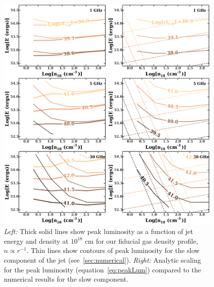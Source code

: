 \documentclass[usenatbib,fleqn]{mnras}
\begin{document}
\begin{figure}
  \includegraphics[width=16cm]{lp_contours_new.pdf}
  \caption{\label{fig:jetContours} {\it {Left:}} Thick solid lines
    show peak luminosity as a function of jet energy and density at
    $10^{18}$ cm for our fiducial gas density profile, $n\propto
    r^{-1}$. Thin lines show contours of peak luminosity for the slow
    component of the jet (see~\ref{sec:numerical}). {\it Right:} Analytic
    scaling for the peak luminosity (equation~\ref{eq:peakLum})
    compared to the numerical results for the slow component.}
\end{figure}
\end{document}
